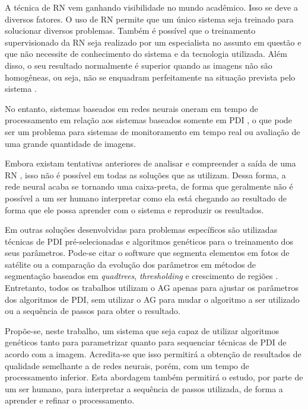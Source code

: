 \documentclass[12pt,oneside,a4paper,english,french,spanish,brazil,]{abntex2}
\begin{document}
A técnica de RN vem ganhando visibilidade no mundo acadêmico. Isso se deve a diversos fatores. O uso de RN permite que um único sistema seja treinado para solucionar diversos problemas. Também é possível que o treinamento supervisionado da RN seja realizado por um especialista no assunto em questão e que não necessite de conhecimento do sistema e da tecnologia utilizada. Além disso, o seu resultado normalmente é superior quando as imagens não são homogêneas, ou seja, não se enquadram perfeitamente na situação prevista pelo sistema \cite{pal:1993}.

No entanto, sistemas baseados em redes neurais oneram em tempo de processamento em relação aos sistemas baseados somente em PDI \cite{huang:1992}, o que pode ser um problema para sistemas de monitoramento em tempo real ou avaliação de uma grande quantidade de imagens.

Embora existam tentativas anteriores de analisar e compreender a saída de uma RN \cite{zeiler:2014}, isso não é possível em todas as soluções que as utilizam. Dessa forma, a rede neural acaba se tornando uma caixa-preta, de forma que geralmente não é possível a um ser humano interpretar como ela está chegando ao resultado de forma que ele possa aprender com o sistema e reproduzir os resultados.

Em outras soluções desenvolvidas para problemas específicos são utilizadas técnicas de PDI pré-selecionadas e algoritmos genéticos \cite{holland:1992} para o treinamento dos seus parâmetros. Pode-se citar o software que segmenta elementos em fotos de satélite \cite{costa:2010} ou a comparação da evolução dos parâmetros em métodos de segmentação baseados em \textit{quadtrees}, \textit{thresholding} e crescimento de regiões \cite{matias:2007}. Entretanto, todos os trabalhos utilizam o AG apenas para ajustar os parâmetros dos algoritmos de PDI, sem utilizar o AG para mudar o algoritmo a ser utilizado ou a sequência de passos para obter o resultado.


Propõe-se, neste trabalho, um sistema que seja capaz de utilizar algoritmos genéticos tanto para parametrizar quanto para sequenciar técnicas de PDI de acordo com a imagem. Acredita-se que isso permitirá a obtenção de resultados de qualidade semelhante a de redes neurais, porém, com um tempo de processamento inferior. Esta abordagem também permitirá o estudo, por parte de um ser humano, para interpretar a sequência de passos utilizada, de forma a aprender e refinar o processamento.
\end{document}
